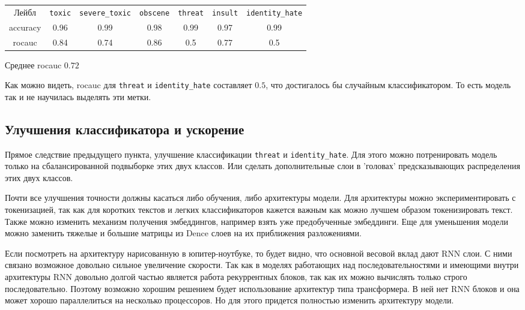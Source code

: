 \documentclass[13pt,a4paper]{article}
\theoremstyle{remark}
\begin{document}
	
	
	\begin{center}
		\begin{tabular}{ c | c | c | c | c | c | c |}
			Лейбл & \verb|toxic| & \verb|severe_toxic| & \verb|obscene| & \verb|threat| & \verb|insult| & \verb|identity_hate| \\
			accuracy & 0.96 & 0.99 & 0.98 & 0.99 & 0.97 & 0.99 \\
			rocauc & 0.84 & 0.74 & 0.86 & 0.5 & 0.77 & 0.5 \\
		\end{tabular}
	\end{center}
	
	Среднее rocauc $0.72$
	
	
	Как можно видеть, rocauc для \verb|threat| и \verb|identity_hate| составляет $0.5$, что достигалось бы случайным классификатором. То есть модель так и не научилась выделять эти метки.
	
	
	\subsection*{Улучшения классификатора и ускорение}

	Прямое следствие предыдущего пункта, улучшение классификации \verb|threat| и \verb|identity_hate|. Для этого можно потренировать модель только на сбалансированной подвыборке этих двух классов. Или сделать дополнительные слои в 'головах' предсказывающих распределения этих двух классов.

	Почти все улучшения точности должны касаться либо обучения, либо архитектуры модели. Для архитектуры можно экспериментировать с токенизацией, так как для коротких текстов и легких классификаторов кажется важным как можно лучшем образом токенизировать текст. Также можно изменить механизм получения эмбеддингов, например взять уже предобученные эмбеддинги. Еще для уменьшения модели можно заменить тяжелые и большие матрицы из Dence слоев на их приближения разложениями.
	
	Если посмотреть на архитектуру нарисованную в юпитер-ноутбуке, то будет видно, что основной весовой вклад дают RNN слои. С ними связано возможное довольно сильное увеличение скорости. Так как в моделях работающих над последовательностями и имеющими внутри архитектуры RNN довольно долгой частью является работа рекуррентных блоков, так как их можно вычислять только строго последовательно. Поэтому возможно хорошим решением будет использование архитектур типа трансформера. В ней нет RNN блоков и она может хорошо параллелиться на несколько процессоров. Но для этого придется полностью изменить архитектуру модели.
	
\end{document}
